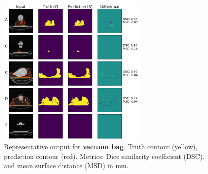 \documentclass[9pt]{beamer}
\begin{document}
  \begin{frame}{}
\begin{figure}
\includegraphics[width=0.665\textwidth]{images/vet_vacbag}
\caption{Representative output for \textbf{vacuum bag}. Truth contour (yellow),
  prediction contour (red). Metrics: Dice similarity coefficient (DSC), and mean
  surface distance (MSD) in mm.}
\end{figure}
\end{frame}
%
\end{document}
